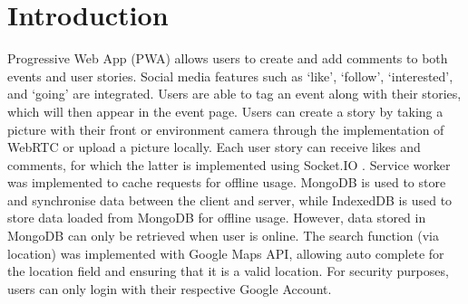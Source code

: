 \documentclass[11pt, a4paper]{article}
\begin{document}
\section{Introduction}
Progressive Web App (PWA) allows users to create and add comments to both events and user stories. 
Social media features such as `like', `follow', `interested', and `going' are integrated. Users 
are able to tag an event along with their stories, which will then appear in the event page. Users 
can create a story by taking a picture with their front or environment camera through the 
implementation of WebRTC or upload a picture locally. Each user story can receive likes and comments, 
for which the latter is implemented using Socket.IO \cite{week6, socketio}. Service worker was 
implemented to cache requests for offline usage. MongoDB is used to store and synchronise data 
between the client and server, while IndexedDB is used to store data loaded from MongoDB for offline 
usage. However, data stored in MongoDB can only be retrieved when user is online. The search function 
(via location) was implemented with Google Maps API, allowing auto complete for the location field 
and ensuring that it is a valid location. For security purposes, users can only login with their 
respective Google Account.
\end{document}
